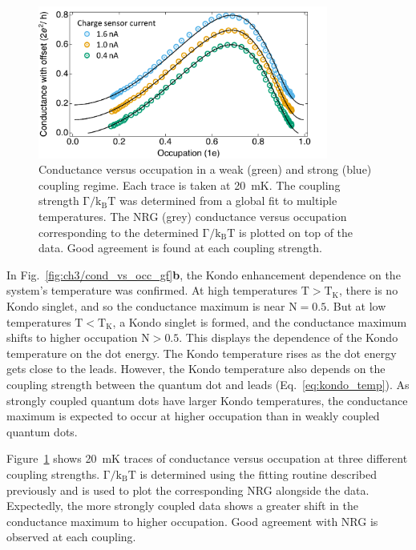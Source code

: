 \begin{figure}[!hbt]
 \begin{center}
 \includegraphics[width=0.85\textwidth]{figures/ch3/figure15.pdf}
 \caption[Conductance versus Occupation : Varying Coupling Strength]{\label{fig:ch3/cond_occ_couplingstrength} 
 Conductance versus occupation in a weak (green) and strong (blue) coupling regime. Each trace is taken at \qty{20}{mK}. The coupling strength $\mathrm{\Gamma/k_BT}$ was determined from a global fit to multiple temperatures. The NRG (grey) conductance versus occupation corresponding to the determined $\mathrm{\Gamma/k_BT}$ is plotted on top of the data. Good agreement is found at each coupling strength.}
 \end{center}
\end{figure}


In Fig.~\ref{fig:ch3/cond_vs_occ_gf}\textbf{b}, the Kondo enhancement dependence on the system's temperature was confirmed. At high temperatures $\mathrm{T>T_K}$, there is no Kondo singlet, and so the conductance maximum is near $\mathrm{N} = 0.5$. But at low temperatures $\mathrm{T<T_K}$, a Kondo singlet is formed, and the conductance maximum shifts to higher occupation $\mathrm{N} > 0.5$. This displays the dependence of the Kondo temperature on the dot energy. The Kondo temperature rises as the dot energy gets close to the leads. However, the Kondo temperature also depends on the coupling strength between the quantum dot and leads (Eq.~\ref{eq:kondo_temp}). As strongly coupled quantum dots have larger Kondo temperatures, the conductance maximum is expected to occur at higher occupation than in weakly coupled quantum dots. 



Figure~\ref{fig:ch3/cond_occ_couplingstrength} shows \qty{20}{mK} traces of conductance versus occupation at three different coupling strengths. $\mathrm{\Gamma/k_BT}$ is determined using the fitting routine described previously and is used to plot the corresponding NRG alongside the data. Expectedly, the more strongly coupled data shows a greater shift in the conductance maximum to higher occupation. Good agreement with NRG is observed at each coupling.






